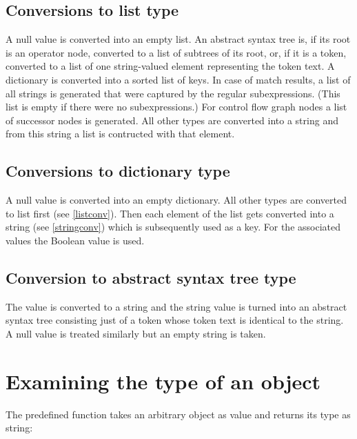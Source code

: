 \subsection{Conversions to list type}

\label{listconv}
A null value is converted into an empty list. An abstract syntax tree
is, if its root is an operator node, converted to a list of subtrees of
its root, or, if it is a token, converted to a list of one string-valued
element representing the token text. A dictionary is converted into a
sorted list of keys. In case of match results, a list of all strings
is generated that were captured by the regular subexpressions. (This
list is empty if there were no subexpressions.) For control flow graph
nodes a list of successor nodes is generated. All other types are
converted into a string and from this string a list is contructed with
that element.

\subsection{Conversions to dictionary type}

\label{dictconv}
A null value is converted into an empty dictionary. All other
types are converted to list first (see \ref{listconv}). Then
each element of the list gets converted into a string
(see \ref{stringconv}) which is subsequently used as a key.
For the associated values the Boolean value  is used.

\subsection{Conversion to abstract syntax tree type}

\label{treeconv}
The value is converted to a string and the string value is turned
into an abstract syntax tree consisting just of a token whose
token text is identical to the string. A null value is treated
similarly but an empty string is taken.

\section{Examining the type of an object}\label{exam-type}

The predefined function  takes an arbitrary object as
value and returns its type as string:

